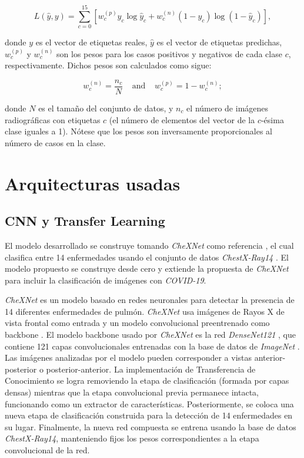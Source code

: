 \begin{equation} \label{eq:loss}
    L(\hat y, y) = \sum_{c=0}^{15} \left[ w_c^{(p)} y_c \log \hat y_c + w_c^{(n)} (1-y_c) \log (1- \hat y_c) \right],
\end{equation}

\noindent donde $y$ es el vector de etiquetas reales, $\hat{y}$ es el vector de etiquetas predichas,
$w_c^{(p)}$ y $w_c^{(n)}$ son los pesos para los casos positivos y negativos de cada clase $c$,
respectivamente. Dichos pesos son calculados como sigue:

\begin{equation}\label{eq:weights}
    w_c^{(n)} = \frac{n_c}{N} \;\;\;\; \text{and} \;\;\;\; w_c^{(p)} = 1-  w_c^{(n)};
\end{equation}

\noindent donde $N$ es el tamaño del conjunto de datos, y $n_c$ el número de imágenes radiográficas con
etiquetas $c$ (el número de elementos del vector de la $c$-ésima clase iguales a 1). Nótese que los
pesos son inversamente proporcionales al número de casos en la clase.


\section{Arquitecturas usadas}

\subsection{CNN y Transfer Learning}

El modelo desarrollado se construye tomando \textit{CheXNet} como referencia \cite{rajpurkar2018deep},
el cual clasifica entre 14 enfermedades usando el conjunto de datos \textit{ChestX-Ray14}
\cite{wang2017chestx}. El modelo propuesto se construye desde cero y extiende la propuesta de
\textit{CheXNet} para incluir la clasificación de imágenes con \textit{COVID-19}.

\textit{CheXNet} es un modelo basado en redes neuronales para detectar la presencia de 14 diferentes
enfermedades de pulmón. \textit{CheXNet} usa imágenes de Rayos X de vista frontal como entrada y un
modelo convolucional preentrenado como backbone \cite{rajpurkar2018deep}. El modelo backbone usado
por \textit{CheXNet} es la red \textit{DenseNet121} \cite{huang2017densely}, que contiene 121 capas
convolucionales entrenadas con la base de datos de \textit{ImageNet} \cite{ILSVRC15}. Las imágenes
analizadas por el modelo pueden corresponder a vistas anterior-posterior o posterior-anterior. La
implementación de Transferencia de Conocimiento se logra removiendo la etapa de clasificación
(formada por capas densas) mientras que la etapa convolucional previa permanece intacta, funcionando
como un extractor de características. Posteriormente, se coloca una nueva etapa de clasificación
construida para la detección de 14 enfermedades en su lugar. Finalmente, la nueva red compuesta se
entrena usando la base de datos \textit{ChestX-Ray14}, manteniendo fijos los pesos correspondientes
a la etapa convolucional de la red.

